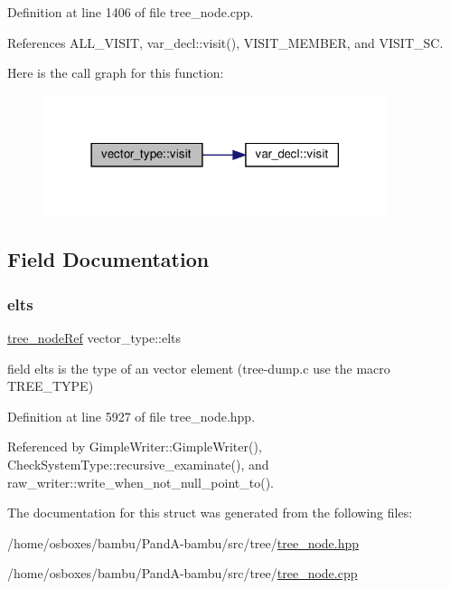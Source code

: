 Definition at line 1406 of file tree\+\_\+node.\+cpp.



References A\+L\+L\+\_\+\+V\+I\+S\+IT, var\+\_\+decl\+::visit(), V\+I\+S\+I\+T\+\_\+\+M\+E\+M\+B\+ER, and V\+I\+S\+I\+T\+\_\+\+SC.

Here is the call graph for this function\+:
\nopagebreak
\begin{figure}[H]
\begin{center}
\leavevmode
\includegraphics[width=285pt]{d3/d55/structvector__type_a628f2913374a823ed425afdd76197459_cgraph}
\end{center}
\end{figure}


\subsection{Field Documentation}
\mbox{\label{structvector__type_a6a0da84b1018518e3977538d55d995a3}} 
\subsubsection{\texorpdfstring{elts}{elts}}
{\footnotesize\ttfamily \hyperlink{tree__node_8hpp_a6ee377554d1c4871ad66a337eaa67fd5}{tree\+\_\+node\+Ref} vector\+\_\+type\+::elts}



field elts is the type of an vector element (tree-\/dump.\+c use the macro T\+R\+E\+E\+\_\+\+T\+Y\+PE) 



Definition at line 5927 of file tree\+\_\+node.\+hpp.



Referenced by Gimple\+Writer\+::\+Gimple\+Writer(), Check\+System\+Type\+::recursive\+\_\+examinate(), and raw\+\_\+writer\+::write\+\_\+when\+\_\+not\+\_\+null\+\_\+point\+\_\+to().



The documentation for this struct was generated from the following files\+:\begin{DoxyCompactItemize}
\item 
/home/osboxes/bambu/\+Pand\+A-\/bambu/src/tree/\hyperlink{tree__node_8hpp}{tree\+\_\+node.\+hpp}\item 
/home/osboxes/bambu/\+Pand\+A-\/bambu/src/tree/\hyperlink{tree__node_8cpp}{tree\+\_\+node.\+cpp}\end{DoxyCompactItemize}
